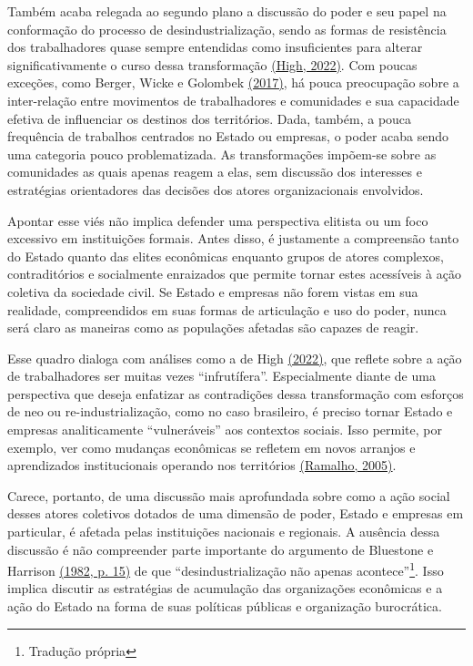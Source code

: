 Também acaba relegada ao segundo plano a discussão do poder e seu papel
na conformação do processo de desindustrialização, sendo as formas de
resistência dos trabalhadores quase sempre entendidas como insuficientes
para alterar significativamente o curso dessa transformação
\href{https://www.zotero.org/google-docs/?pGTrMe}{(High, 2022)}. Com
poucas exceções, como Berger, Wicke e Golombek
\href{https://www.zotero.org/google-docs/?9i2v0M}{(2017)}, há pouca
preocupação sobre a inter-relação entre movimentos de trabalhadores e
comunidades e sua capacidade efetiva de influenciar os destinos dos
territórios. Dada, também, a pouca frequência de trabalhos centrados no
Estado ou empresas, o poder acaba sendo uma categoria pouco
problematizada. As transformações impõem-se sobre as comunidades as
quais apenas reagem a elas, sem discussão dos interesses e estratégias
orientadores das decisões dos atores organizacionais envolvidos.

Apontar esse viés não implica defender uma perspectiva elitista ou um
foco excessivo em instituições formais. Antes disso, é justamente a
compreensão tanto do Estado quanto das elites econômicas enquanto grupos
de atores complexos, contraditórios e socialmente enraizados que permite
tornar estes acessíveis à ação coletiva da sociedade civil. Se Estado e
empresas não forem vistas em sua realidade, compreendidos em suas formas
de articulação e uso do poder, nunca será claro as maneiras como as
populações afetadas são capazes de reagir.

Esse quadro dialoga com análises como a de High
\href{https://www.zotero.org/google-docs/?RNRlkC}{(2022)}, que reflete
sobre a ação de trabalhadores ser muitas vezes ``infrutífera''.
Especialmente diante de uma perspectiva que deseja enfatizar as
contradições dessa transformação com esforços de neo ou
re-industrialização, como no caso brasileiro, é preciso tornar Estado e
empresas analiticamente ``vulneráveis'' aos contextos sociais. Isso
permite, por exemplo, ver como mudanças econômicas se refletem em novos
arranjos e aprendizados institucionais operando nos territórios
\href{https://www.zotero.org/google-docs/?chPHjZ}{(Ramalho, 2005)}.

Carece, portanto, de uma discussão mais aprofundada sobre como a ação
social desses atores coletivos dotados de uma dimensão de poder, Estado
e empresas em particular, é afetada pelas instituições nacionais e
regionais. A ausência dessa discussão é não compreender parte importante
do argumento de Bluestone e Harrison
\href{https://www.zotero.org/google-docs/?D50Tmf}{(1982, p. 15)} de que
``desindustrialização não apenas acontece''\footnote{Tradução própria}.
Isso implica discutir as estratégias de acumulação das organizações
econômicas e a ação do Estado na forma de suas políticas públicas e
organização burocrática.

